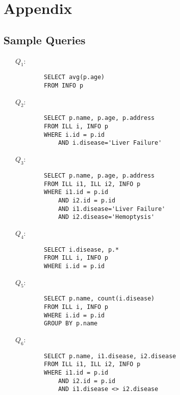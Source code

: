 
\section{Appendix}
\label{app}

\subsection{Sample Queries}
\label{app:queries}

\begin{itemize}

    \item[$Q_1$:] \begin{verbatim}
        SELECT avg(p.age)
        FROM INFO p
    \end{verbatim}

    \item[$Q_2$:] \begin{verbatim}
        SELECT p.name, p.age, p.address 
        FROM ILL i, INFO p 
        WHERE i.id = p.id 
            AND i.disease='Liver Failure'
    \end{verbatim}
    
    \item[$Q_3$:] \begin{verbatim}
        SELECT p.name, p.age, p.address 
        FROM ILL i1, ILL i2, INFO p 
        WHERE i1.id = p.id 
            AND i2.id = p.id 
            AND i1.disease='Liver Failure' 
            AND i2.disease='Hemoptysis'
    \end{verbatim}

    \item[$Q_4$:] \begin{verbatim}
        SELECT i.disease, p.* 
        FROM ILL i, INFO p 
        WHERE i.id = p.id
    \end{verbatim}
   
    \item[$Q_5$:] \begin{verbatim}
        SELECT p.name, count(i.disease) 
        FROM ILL i, INFO p 
        WHERE i.id = p.id 
        GROUP BY p.name 
    \end{verbatim}

    \item[$Q_6$:] \begin{verbatim}
        SELECT p.name, i1.disease, i2.disease 
        FROM ILL i1, ILL i2, INFO p 
        WHERE i1.id = p.id 
            AND i2.id = p.id 
            AND i1.disease <> i2.disease
    \end{verbatim}


\end{itemize}


